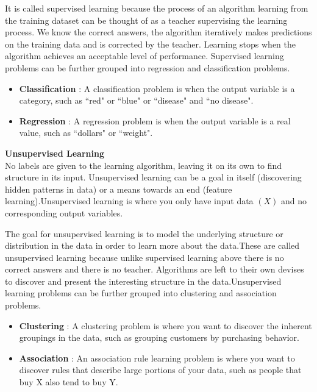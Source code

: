 It is called supervised learning because the process of an algorithm learning from the training
dataset can be thought of as a teacher supervising the learning process. We know the correct
answers, the algorithm iteratively makes predictions on the training data and is corrected by the
teacher. Learning stops when the algorithm achieves an acceptable level of performance. Supervised
learning problems can be further grouped into regression and classification problems.

\begin{itemize}
\item \textbf{Classification} : A classification problem is when the output variable is a category, such as
``red" or ``blue" or ``disease" and ``no disease".
\item \textbf{Regression} : A regression problem is when the output variable is a real value, such as
``dollars" or ``weight".\\
\end{itemize}

\textbf{Unsupervised Learning}\\
No labels are given to the learning algorithm, leaving it on its own to find structure in its
input. Unsupervised learning can be a goal in itself (discovering hidden patterns in data) or a
means towards an end (feature learning).Unsupervised learning is where you only have input
data $(X)$ and no corresponding output variables.

The goal for unsupervised learning is to model the underlying structure or distribution in the
data in order to learn more about the data.These are called unsupervised learning because unlike
supervised learning above there is no correct answers and there is no teacher. Algorithms are left
to their own devises to discover and present the interesting structure in the data.Unsupervised
learning problems can be further grouped into clustering and association problems.

\begin{itemize}
\item \textbf{Clustering} : A clustering problem is where you want to discover the inherent groupings
in the data, such as grouping customers by purchasing behavior.
\item \textbf{Association} : An association rule learning problem is where you want to discover rules
that describe large portions of your data, such as people that buy X also tend to buy Y.\\
\end{itemize}

